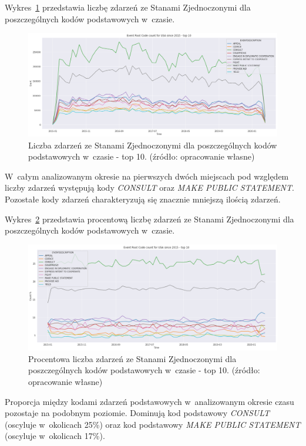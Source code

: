 \documentclass[11pt]{report}
\begin{document}
    Wykres~\ref{fig:USAPERCinTIME} przedstawia liczbę zdarzeń ze Stanami Zjednoczonymi dla poszczególnych kodów podstawowych w~czasie.
    \begin{figure}[!htp]
        \centering
        \includegraphics[width=\linewidth]{fig/USA/USAERCinTIME.png}
        \caption{Liczba zdarzeń ze Stanami Zjednoczonymi dla poszczególnych kodów podstawowych w~czasie - top 10. (źródło: opracowanie własne)}
        \label{fig:USAPERCinTIME}
    \end{figure}
    W~całym analizowanym okresie na pierwszych dwóch miejscach pod względem liczby zdarzeń występują kody \textit{CONSULT} oraz \textit{MAKE PUBLIC STATEMENT}.
    Pozostałe kody zdarzeń charakteryzują się znacznie mniejszą ilością zdarzeń.

    Wykres~\ref{fig:USAPERCpercinTIME} przedstawia procentową liczbę zdarzeń ze Stanami Zjednoczonymi dla poszczególnych kodów podstawowych w~czasie.
    \begin{figure}[!htp]
        \centering
        \includegraphics[width=\linewidth]{fig/USA/USAERCpercinTIME.png}
        \caption{Procentowa liczba zdarzeń ze Stanami Zjednoczonymi dla poszczególnych kodów podstawowych w~czasie - top 10. (źródło: opracowanie własne)}
        \label{fig:USAPERCpercinTIME}
    \end{figure}
    Proporcja między kodami zdarzeń podstawowych w~analizowanym okresie czasu pozostaje na podobnym poziomie.
    Dominują kod podstawowy \textit{CONSULT} (oscyluje w~okolicach 25\%) oraz kod podstawowy \textit{MAKE PUBLIC STATEMENT} (oscyluje w~okolicach 17\%).
\end{document}
